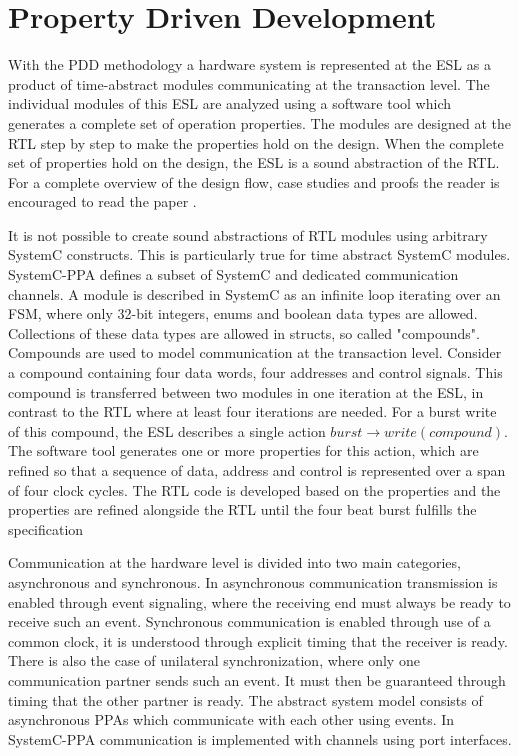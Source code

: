 \section{Property Driven Development}
\label{sec:pdd}
With the PDD methodology a hardware system is represented at the ESL as a product of time-abstract modules communicating at the transaction level. The individual modules of this ESL are analyzed using a software tool \cite{descam} which generates a complete set of operation properties. The modules are designed at the RTL step by step to make the properties hold on the design. When the complete set of properties hold on the design, the ESL is a sound abstraction of the RTL. For a complete overview of the design flow, case studies and proofs the reader is encouraged to read the paper \cite{pddref}. \par
It is not possible to create sound abstractions of RTL modules using arbitrary SystemC constructs. This is particularly true for time abstract SystemC modules. SystemC-PPA defines a subset of SystemC and dedicated communication channels. A module is described in SystemC as an infinite loop iterating over an FSM, where only 32-bit integers, enums and boolean data types are allowed. Collections of these data types are allowed in structs, so called "compounds". Compounds are used to model communication at the transaction level. Consider a compound containing four data words, four addresses and control signals. This compound is transferred between two modules in one iteration at the ESL, in contrast to the RTL where at least four iterations are needed. For a burst write of this compound, the ESL describes a single action $burst\rightarrow write(compound)$. The software tool generates one or more properties for this action, which are refined so that a sequence of data, address and control is represented over a span of four clock cycles. The RTL code is developed based on the properties and the properties are refined alongside the RTL until the four beat burst fulfills the specification \par
Communication at the hardware level is divided into two main categories, asynchronous and synchronous. In asynchronous communication transmission is enabled through event signaling, where the receiving end must always be ready to receive such an event. Synchronous communication is enabled through use of a common clock, it is understood through explicit timing that the receiver is ready. There is also the case of unilateral synchronization, where only one communication partner sends such an event. It must then be guaranteed through timing that the other partner is ready. The abstract system model consists of asynchronous PPAs which communicate with each other using events. In SystemC-PPA communication is implemented with channels using port interfaces.


